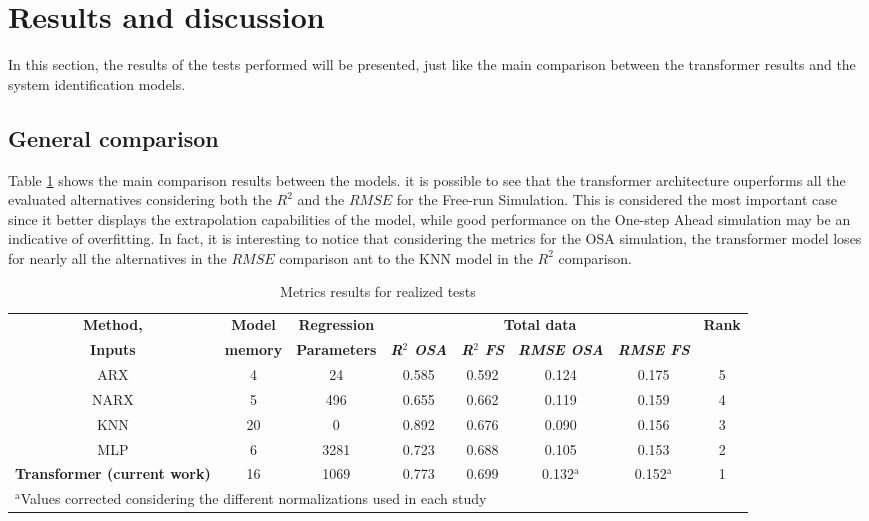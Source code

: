\documentclass[conference]{IEEEtran}
\begin{document}
\section{Results and discussion}\label{sec:section_results}

In this section, the results of the tests performed will be presented, just like the main comparison between the transformer
results and the system identification models.

\subsection{General comparison}

Table \ref{tab:main_results} shows the main comparison results between the models. it is possible to see that the transformer architecture ouperforms
all the evaluated alternatives considering both the $R^2$ and the $RMSE$ for the Free-run Simulation. This is considered the most important case
since it better displays the extrapolation capabilities of the model, while good performance on the One-step Ahead simulation may be an indicative of
overfitting. In fact, it is interesting to notice that considering the metrics for the OSA simulation, the transformer model loses for nearly all the
alternatives in the $RMSE$ comparison ant to the KNN model in the $R^2$ comparison.

\begin{table}[htbp]
\caption{Metrics results for realized tests}
\begin{center}
\begin{tabular}{|c|c|c|c|c|c|c|c|}
\hline
\textbf{Method,}&\textbf{Model}& \textbf{Regression} &\multicolumn{4}{c|}{\textbf{Total data}}&\textbf{Rank} \\
\cline{4-7} 
\textbf{Inputs} & \textbf{memory}& \textbf{Parameters} &\textbf{\textit{R$^{\mathrm{2}}$ OSA}}& \textbf{\textit{R$^{\mathrm{2}}$ FS}} & \textbf{\textit{RMSE OSA}}& \textbf{\textit{RMSE FS}}& \\
\hline
ARX                                  &  4 &   24 & 0.585 & 0.592 & 0.124 & 0.175&5\\
\hline
NARX                                 &  5 &  496 & 0.655 & 0.662 & 0.119 & 0.159&4\\
\hline
KNN                                  & 20 &    0 & 0.892 & 0.676 & 0.090 & 0.156&3\\
\hline
MLP                                  &  6 & 3281 & 0.723 & 0.688 & 0.105 & 0.153&2\\
\hline
\textbf{Transformer (current work)}  & 16 & 1069 & 0.773 & 0.699 & 0.132$^\mathrm{a}$ & 0.152$^\mathrm{a}$ &1\\
\hline
\multicolumn{7}{l}{$^{\mathrm{a}}$Values corrected considering the different normalizations used in each study} \\
\end{tabular}
\label{tab:main_results}
\end{center}
\end{table}
\end{document}
